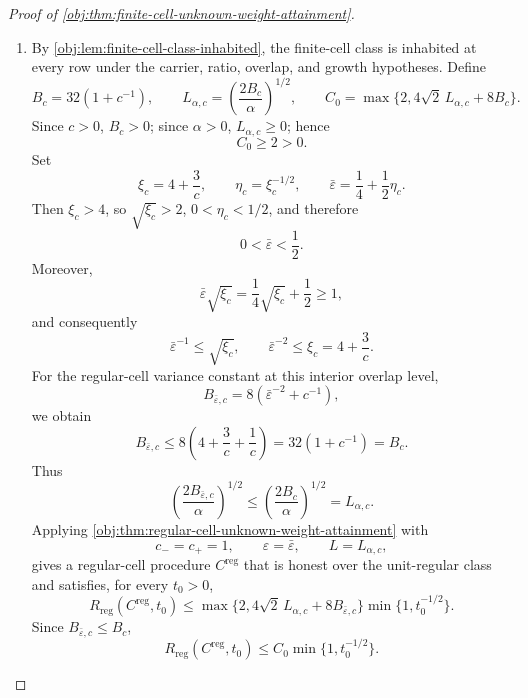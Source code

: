 \begin{proof}[Proof of \cref{obj:thm:finite-cell-unknown-weight-attainment}]
\begin{enumerate}
\item
By \cref{obj:lem:finite-cell-class-inhabited}, the finite-cell class is inhabited at every row under the carrier, ratio, overlap, and growth hypotheses.  Define
\[
B_c=32(1+c^{-1}),\qquad
L_{\alpha,c}=\left(\frac{2B_c}{\alpha}\right)^{1/2},\qquad
C_0=\max\{2,4\sqrt2\,L_{\alpha,c}+8B_c\}.
\]
Since \(c>0\), \(B_c>0\); since \(\alpha>0\), \(L_{\alpha,c}\ge0\); hence
\[
C_0\ge2>0.
\]
Set
\[
\xi_c=4+\frac3c,\qquad
\eta_c=\xi_c^{-1/2},\qquad
\bar\varepsilon=\frac14+\frac12\eta_c .
\]
Then \(\xi_c>4\), so \(\sqrt{\xi_c}>2\), \(0<\eta_c<1/2\), and therefore
\[
0<\bar\varepsilon<\frac12 .
\]
Moreover,
\[
\bar\varepsilon\sqrt{\xi_c}
=
\frac14\sqrt{\xi_c}+\frac12
\ge 1,
\]
and consequently
\[
\bar\varepsilon^{-1}\le \sqrt{\xi_c},
\qquad
\bar\varepsilon^{-2}\le \xi_c=4+\frac3c .
\]
For the regular-cell variance constant at this interior overlap level,
\[
B_{\bar\varepsilon,c}
=
8(\bar\varepsilon^{-2}+c^{-1}),
\]
we obtain
\[
B_{\bar\varepsilon,c}
\le
8\left(4+\frac3c+\frac1c\right)
=
32(1+c^{-1})
=
B_c .
\]
Thus
\[
\left(\frac{2B_{\bar\varepsilon,c}}{\alpha}\right)^{1/2}
\le
\left(\frac{2B_c}{\alpha}\right)^{1/2}
=
L_{\alpha,c}.
\]
Applying \cref{obj:thm:regular-cell-unknown-weight-attainment} with
\[
c_-=c_+=1,\qquad \varepsilon=\bar\varepsilon,\qquad L=L_{\alpha,c},
\]
gives a regular-cell procedure \(C^{\mathrm{reg}}\) that is honest over the unit-regular class and satisfies, for every \(t_0>0\),
\[
R_{\mathrm{reg}}(C^{\mathrm{reg}},t_0)
\le
\max\{2,4\sqrt2\,L_{\alpha,c}+8B_{\bar\varepsilon,c}\}
\min\{1,t_0^{-1/2}\}.
\]
Since \(B_{\bar\varepsilon,c}\le B_c\),
\[
R_{\mathrm{reg}}(C^{\mathrm{reg}},t_0)
\le
C_0\min\{1,t_0^{-1/2}\}.
\]


\end{enumerate}
\end{proof}

